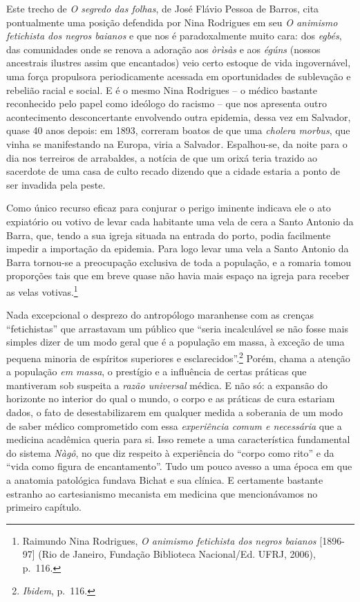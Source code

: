 Este trecho de \emph{O segredo das folhas}, de José Flávio Pessoa de
Barros, cita pontualmente uma posição defendida por Nina Rodrigues em
seu \emph{O animismo fetichista dos negros baianos} e que nos é
paradoxalmente muito cara: dos \emph{egbés}, das comunidades onde se
renova a adoração aos \emph{òrìsàs} e aos \emph{égúns} (nossos
ancestrais ilustres assim que encantados) veio certo estoque de vida
ingovernável, uma força propulsora periodicamente acessada em
oportunidades de sublevação e rebelião racial e social. E é o mesmo Nina
Rodrigues -- o médico bastante reconhecido pelo papel como ideólogo do
racismo -- que nos apresenta outro acontecimento desconcertante
envolvendo outra epidemia, dessa vez em Salvador, quase 40 anos depois:
em 1893, correram boatos de que uma \emph{cholera morbus}, que vinha se
manifestando na Europa, viria a Salvador\emph{.} Espalhou-se, da noite
para o dia nos terreiros de arrabaldes, a notícia de que um orixá teria
trazido ao sacerdote de uma casa de culto recado dizendo que a cidade
estaria a ponto de ser invadida pela peste.

Como único recurso eficaz para conjurar o perigo iminente indicava ele o
ato expiatório ou votivo de levar cada habitante uma vela de cera a
Santo Antonio da Barra, que, tendo a sua igreja situada na entrada do
porto, podia facilmente impedir a importação da epidemia. Para logo
levar uma vela a Santo Antonio da Barra tornou-se a preocupação
exclusiva de toda a população, e a romaria tomou proporções tais que em
breve quase não havia mais espaço na igreja para receber as velas
votivas.\footnote{Raimundo Nina Rodrigues, \emph{O animismo fetichista
  dos negros baianos} {[}1896-97{]} (Rio de Janeiro, Fundação Biblioteca
  Nacional/Ed. UFRJ, 2006), p.~116.}

Nada excepcional o desprezo do antropólogo maranhense com as crenças
``fetichistas'' que arrastavam um público que ``seria incalculável se
não fosse mais simples dizer de um modo geral que é a população em
massa, à exceção de uma pequena minoria de espíritos superiores e
esclarecidos''.\footnote{\emph{Ibidem}, p.~116.} Porém, chama a atenção
a população \emph{em massa}, o prestígio e a influência de certas
práticas que mantiveram sob suspeita a \emph{razão universal} médica. E
não só: a expansão do horizonte no interior do qual o mundo, o corpo e
as práticas de cura estariam dados, o fato de desestabilizarem em
qualquer medida a soberania de um modo de saber médico comprometido com
essa \emph{experiência comum e necessária} que a medicina acadêmica
queria para si. Isso remete a uma característica fundamental do sistema
\emph{Nàgô}, no que diz respeito à experiência do ``corpo como rito'' e
da ``vida como figura de encantamento''. Tudo um pouco avesso a uma
época em que a anatomia patológica fundava Bichat e sua clínica. E
certamente bastante estranho ao cartesianismo mecanista em medicina que
mencionávamos no primeiro capítulo.

